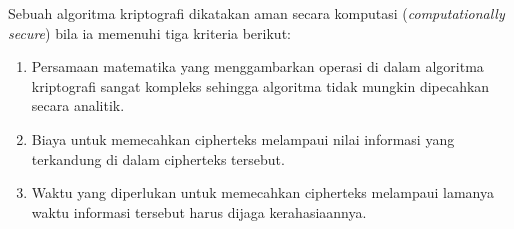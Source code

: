 \documentclass{article}
\begin{document}

Sebuah algoritma kriptografi dikatakan aman secara komputasi (\textit{computationally secure}) bila ia memenuhi tiga kriteria berikut:

\begin{enumerate}
    \item Persamaan matematika yang menggambarkan operasi di dalam algoritma kriptografi sangat kompleks sehingga algoritma tidak mungkin dipecahkan secara analitik.
    \item Biaya untuk memecahkan cipherteks melampaui nilai informasi yang terkandung di dalam cipherteks tersebut.
    \item Waktu yang diperlukan untuk memecahkan cipherteks melampaui lamanya waktu informasi tersebut harus dijaga kerahasiaannya.
\end{enumerate}
\end{document}
